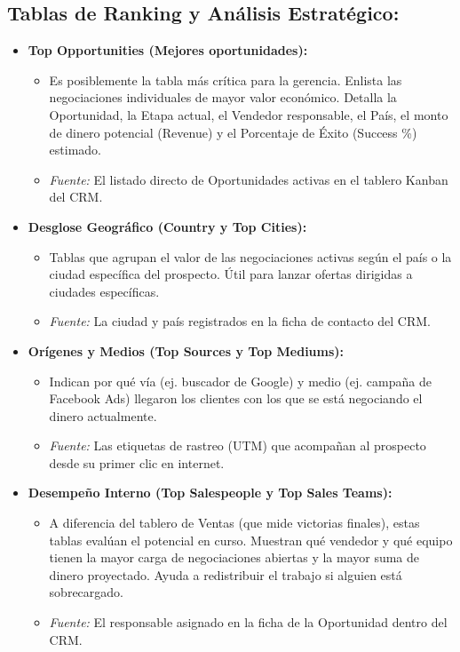 \documentclass[11pt,a4paper]{article}
\begin{document}
\subsection*{Tablas de Ranking y Análisis Estratégico:}
\begin{itemize}[leftmargin=*]
    \item \textbf{Top Opportunities (Mejores oportunidades):}
    \begin{itemize}
        \item Es posiblemente la tabla más crítica para la gerencia. Enlista las negociaciones individuales de mayor valor económico. Detalla la Oportunidad, la Etapa actual, el Vendedor responsable, el País, el monto de dinero potencial (Revenue) y el Porcentaje de Éxito (Success \%) estimado.
        \item \textit{Fuente:} El listado directo de Oportunidades activas en el tablero Kanban del CRM.
    \end{itemize}
    \item \textbf{Desglose Geográfico (Country y Top Cities):}
    \begin{itemize}
        \item Tablas que agrupan el valor de las negociaciones activas según el país o la ciudad específica del prospecto. Útil para lanzar ofertas dirigidas a ciudades específicas.
        \item \textit{Fuente:} La ciudad y país registrados en la ficha de contacto del CRM.
    \end{itemize}
    \item \textbf{Orígenes y Medios (Top Sources y Top Mediums):}
    \begin{itemize}
        \item Indican por qué vía (ej. buscador de Google) y medio (ej. campaña de Facebook Ads) llegaron los clientes con los que se está negociando el dinero actualmente.
        \item \textit{Fuente:} Las etiquetas de rastreo (UTM) que acompañan al prospecto desde su primer clic en internet.
    \end{itemize}
    \item \textbf{Desempeño Interno (Top Salespeople y Top Sales Teams):}
    \begin{itemize}
        \item A diferencia del tablero de Ventas (que mide victorias finales), estas tablas evalúan el potencial en curso. Muestran qué vendedor y qué equipo tienen la mayor carga de negociaciones abiertas y la mayor suma de dinero proyectado. Ayuda a redistribuir el trabajo si alguien está sobrecargado.
        \item \textit{Fuente:} El responsable asignado en la ficha de la Oportunidad dentro del CRM.
    \end{itemize}
\end{itemize}
\end{document}

